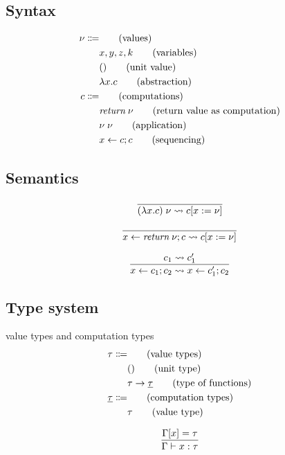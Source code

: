 {\subsection{Syntax}
\begin{align*}
	\nu \Coloneqq	&													\tag{values} \\
									& x, y, z, k							\tag{variables} \\
									& ()									\tag{unit value} \\
									& \lambda x . c					\tag{abstraction} \\
	c \Coloneqq&													\tag{computations} \\
									& \textit{return} \; \nu					\tag{return value as computation} \\
									& \nu \; \nu				\tag{application} \\
									& x \leftarrow c ; c		\tag{sequencing} \\
\end{align*}

\subsection{Semantics}
\[\frac{
}{
	(\lambda x . c) \; \nu \rightsquigarrow c[x := \nu]
}\]

\[\frac{
}{
	x \leftarrow \textit{return} \; \nu ; c \rightsquigarrow c[x := \nu]
}\]

\[\frac{
	c_1 \rightsquigarrow c_1'
}{
	x \leftarrow c_1 ; c_2 \rightsquigarrow x \leftarrow c_1' ; c_2
}\]

\subsection{Type system}
value types and computation types\\
\begin{align*}
	\tau \Coloneqq 	& 												\tag{value types} \\
									& ()									\tag{unit type} \\
									& \tau \rightarrow \underline{\tau}				\tag{type of functions} \\
	\underline{\tau} \Coloneqq 	& 												\tag{computation types} \\
									& \tau											\tag{value type} \\
\end{align*}

\[\frac{
	\Gamma[x] = \tau
}{
	\Gamma \vdash x : \tau
}\]

}
